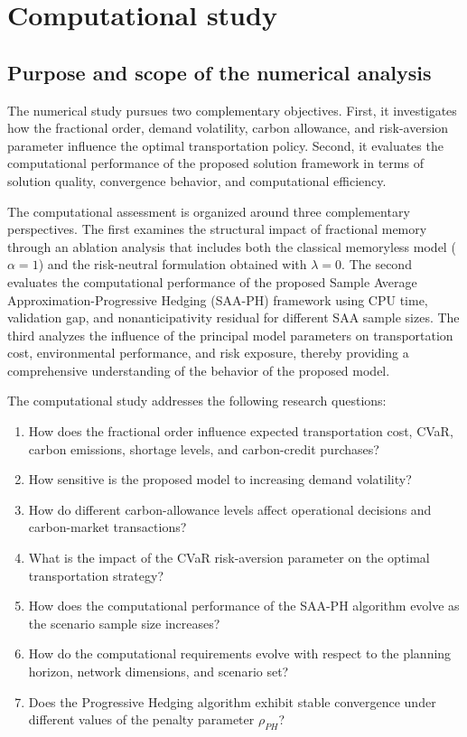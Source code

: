 \section{Computational study}

\subsection{Purpose and scope of the numerical analysis}

The numerical study pursues two complementary objectives. First, it investigates how the fractional order, demand volatility, carbon allowance, and risk-aversion parameter influence the optimal transportation policy. Second, it evaluates the computational performance of the proposed solution framework in terms of solution quality, convergence behavior, and computational efficiency.

The computational assessment is organized around three complementary perspectives. The first examines the structural impact of fractional memory through an ablation analysis that includes both the classical memoryless model ($\alpha=1$) and the risk-neutral formulation obtained with $\lambda=0$. The second evaluates the computational performance of the proposed Sample Average Approximation-Progressive Hedging (SAA-PH) framework using CPU time, validation gap, and nonanticipativity residual for different SAA sample sizes. The third analyzes the influence of the principal model parameters on transportation cost, environmental performance, and risk exposure, thereby providing a comprehensive understanding of the behavior of the proposed model.

The computational study addresses the following research questions:

\begin{enumerate}[label=\textbf{Q\arabic*.},leftmargin=2.0em]
    \item How does the fractional order influence expected transportation cost, CVaR, carbon emissions, shortage levels, and carbon-credit purchases?
    \item How sensitive is the proposed model to increasing demand volatility?
    \item How do different carbon-allowance levels affect operational decisions and carbon-market transactions?
    \item What is the impact of the CVaR risk-aversion parameter on the optimal transportation strategy?
    \item How does the computational performance of the SAA-PH algorithm evolve as the scenario sample size increases?
    \item How do the computational requirements evolve with respect to the planning horizon, network dimensions, and scenario set?
    \item Does the Progressive Hedging algorithm exhibit stable convergence under different values of the penalty parameter $\rho_{PH}$?
\end{enumerate}

